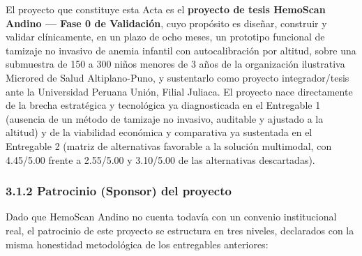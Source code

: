 \documentclass[11pt,a4paper]{article}
\begin{document}
El proyecto que constituye esta Acta es el \textbf{proyecto de tesis HemoScan Andino --- Fase 0 de Validación}, cuyo propósito es diseñar, construir y validar clínicamente, en un plazo de ocho meses, un prototipo funcional de tamizaje no invasivo de anemia infantil con autocalibración por altitud, sobre una submuestra de 150 a 300 niños menores de 3 años de la organización ilustrativa Microred de Salud Altiplano-Puno, y sustentarlo como proyecto integrador/tesis ante la Universidad Peruana Unión, Filial Juliaca. El proyecto nace directamente de la brecha estratégica y tecnológica ya diagnosticada en el Entregable 1 (ausencia de un método de tamizaje no invasivo, auditable y ajustado a la altitud) y de la viabilidad económica y comparativa ya sustentada en el Entregable 2 (matriz de alternativas favorable a la solución multimodal, con 4.45/5.00 frente a 2.55/5.00 y 3.10/5.00 de las alternativas descartadas).

\subsubsection{3.1.2 Patrocinio (Sponsor) del proyecto}\label{patrocinio-sponsor-del-proyecto}

Dado que HemoScan Andino no cuenta todavía con un convenio institucional real, el patrocinio de este proyecto se estructura en tres niveles, declarados con la misma honestidad metodológica de los entregables anteriores:
\end{document}
